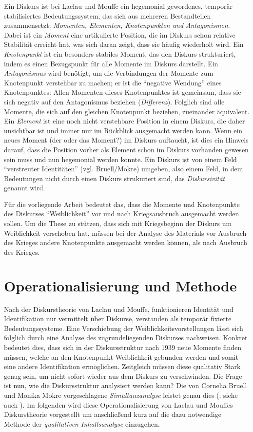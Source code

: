 \documentclass[12pt, titlepage=true, toc=bib]{scrartcl}
\begin{document}
Ein Diskurs ist bei Laclau und Mouffe ein hegemonial gewordenes, temporär stabilisiertes Bedeutungssystem, das sich aus mehreren Bestandteilen zusammensetzt: \textit{Momenten, Elementen, Knotenpunkten \textit{und }Antagonismen}. Dabei ist ein \textit{Moment} eine artikulierte Position, die im Diskurs schon relative Stabilität erreicht hat, was sich daran zeigt, dass sie häufig wiederholt wird. Ein \textit{Knotenpunkt} ist ein besonders stabiles Moment, das den Diskurs strukturiert, indem es einen Bezugspunkt für alle Momente im Diskurs darstellt. Ein \textit{Antagonismus} wird benötigt, um die Verbindungen der Momente zum Knotenpunkt verstehbar zu machen; er ist die "`negative Wendung"' eines Knotenpunktes: Allen Momenten dieses Knotenpunktes ist gemeinsam, dass sie sich negativ auf den Antagonismus beziehen (\textit{Differenz}). Folglich sind alle Momente, die sich auf den gleichen Knotenpunkt beziehen, zueinander äquivalent. Ein \textit{Element} ist eine noch nicht verstehbare Position in einem Diskurs, die daher unsichtbar ist und immer nur im Rückblick ausgemacht werden kann. Wenn ein neues Moment (der oder das Moment?) im Diskurs auftaucht, ist dies ein Hinweis darauf, dass die Position vorher als Element schon im Diskurs vorhanden gewesen sein muss und nun hegemonial werden konnte. Ein Diskurs ist von einem Feld "`verstreuter Identitäten"' (vgl. Bruell/Mokre) umgeben, also einem Feld, in dem Bedeutungen nicht durch einen Diskurs strukuriert sind, das \textit{Diskursivität} genannt wird. 

Für die vorliegende Arbeit bedeutet das, dass die Momente und Knotenpunkte des Diskurses "`Weiblichkeit"' vor und nach Kriegsausbruch ausgemacht werden sollen. Um die These zu stützen, dass sich mit Kriegsbeginn der Diskurs um Weiblichkeit verschoben hat, müssen bei der Analyse des Materials vor Ausbruch des Krieges andere Knotenpunkte ausgemacht werden können, als nach Ausbruch des Krieges. 



\section{Operationalisierung und Methode}

Nach der Diskurstheorie von Laclau und Mouffe, funktionieren Identität und Identifikation nur vermittelt über Diskurse, verstanden als temporär fixierte Bedeutungssysteme. Eine Verschiebung der Weiblichkeitsvorstellungen lässt sich folglich durch eine Analyse des zugrundeliegenden Diskurses nachweisen. Konkret bedeutet dies, dass sich in der Diskursstruktur nach 1939 neue Momente finden müssen, welche an den Knotenpunkt Weiblichkeit gebunden werden und somit eine andere Identifikation ermöglichen. Zeitgleich müssen diese qualitativ Stark genug sein, um nicht sofort wieder aus dem Diskurs zu verschwinden. Die Frage ist nun, wie die Diskursstruktur analysiert werden kann? Die von Cornelia Bruell und Monika Mokre vorgeschlagene \textit{Simultanzanalyse} leistet genau dies (\cite*{bruell_chancen_2006}; siehe auch \cite{nonhoff_kollektive_2007}). Im folgenden wird diese Operationalisierung von Laclau und Mouffes Diskurstheorie vorgestellt um anschließend kurz auf die dazu notwendige Methode der \textit{qualitativen Inhaltsanalyse} einzugehen.
\end{document}
